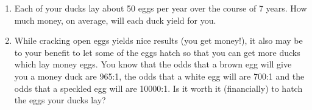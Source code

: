 \documentclass{article}
\begin{document}
\begin{enumerate}
\vspace{2in}

\item Each of your ducks lay about 50 eggs per year over the course of 7 years. How much money, on average, will each duck yield for you.

\vspace{2in}

\item While cracking open eggs yields nice results (you get money!), it also may be to your benefit to let some of the eggs hatch so that you can get more ducks which lay money eggs. You know that the odds that a brown egg will give you a money duck are 965:1, the odds that a white egg will are 700:1 and the odds that a speckled egg will are 10000:1. Is it worth it (financially) to hatch the eggs your ducks lay?

\end{enumerate}
\end{document}
